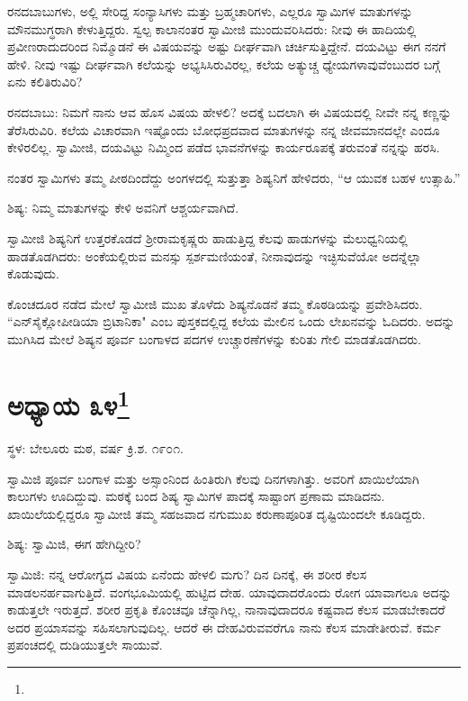 ರನದಬಾಬುಗಳು, ಅಲ್ಲಿ ಸೇರಿದ್ದ ಸಂನ್ಯಾಸಿಗಳು ಮತ್ತು ಬ್ರಹ್ಮಚಾರಿಗಳು, ಎಲ್ಲರೂ ಸ್ವಾಮಿಗಳ ಮಾತುಗಳನ್ನು ಮೌನಮುಗ್ಧರಾಗಿ ಕೇಳುತ್ತಿದ್ದರು. ಸ್ವಲ್ಪ ಕಾಲಾನಂತರ ಸ್ವಾಮೀಜಿ ಮುಂದುವರಿಸಿದರು: ನೀವು ಈ ಹಾದಿಯಲ್ಲಿ ಪ್ರವೀಣರಾದುದರಿಂದ ನಿಮ್ಮೊಡನೆ ಈ ವಿಷಯವನ್ನು ಅಷ್ಟು ದೀರ್ಘವಾಗಿ ಚರ್ಚಿಸುತ್ತಿದ್ದೇನೆ. ದಯವಿಟ್ಟು ಈಗ ನನಗೆ ಹೇಳಿ. ನೀವು ಇಷ್ಟು ದೀರ್ಘವಾಗಿ ಕಲೆಯನ್ನು ಅಭ್ಯಸಿಸಿರುವಿರಲ್ಲ, ಕಲೆಯ ಅತ್ಯುಚ್ಚ ಧ್ಯೇಯಗಳಾವುವೆಂಬುದರ ಬಗ್ಗೆ ಏನು ಕಲಿತಿರುವಿರಿ?

ರನದಬಾಬು: ನಿಮಗೆ ನಾನು ಆವ ಹೊಸ ವಿಷಯ ಹೇಳಲಿ? ಅದಕ್ಕೆ ಬದಲಾಗಿ ಈ ವಿಷಯದಲ್ಲಿ ನೀವೇ ನನ್ನ ಕಣ್ಣನ್ನು ತೆರೆಸಿರುವಿರಿ. ಕಲೆಯ ವಿಚಾರವಾಗಿ ಇಷ್ಟೊಂದು ಬೋಧಪ್ರದವಾದ ಮಾತುಗಳನ್ನು ನನ್ನ ಜೀವಮಾನದಲ್ಲೇ ಎಂದೂ ಕೇಳಿರಲಿಲ್ಲ. ಸ್ವಾಮೀಜಿ, ದಯವಿಟ್ಟು ನಿಮ್ಮಿಂದ ಪಡೆದ ಭಾವನೆಗಳನ್ನು ಕಾರ್ಯರೂಪಕ್ಕೆ ತರುವಂತೆ ನನ್ನನ್ನು ಹರಸಿ.

ನಂತರ ಸ್ವಾಮಿಗಳು ತಮ್ಮ ಪೀಠದಿಂದೆದ್ದು ಅಂಗಳದಲ್ಲಿ ಸುತ್ತುತ್ತಾ ಶಿಷ್ಯನಿಗೆ ಹೇಳಿದರು, “ಆ ಯುವಕ ಬಹಳ ಉತ್ಸಾಹಿ.”

ಶಿಷ್ಯ: ನಿಮ್ಮ ಮಾತುಗಳನ್ನು ಕೇಳಿ ಅವನಿಗೆ ಆಶ್ಚರ್ಯವಾಗಿದೆ.

ಸ್ವಾಮೀಜಿ ಶಿಷ್ಯನಿಗೆ ಉತ್ತರಕೊಡದೆ ಶ‍್ರೀರಾಮಕೃಷ್ಣರು ಹಾಡುತ್ತಿದ್ದ ಕೆಲವು ಹಾಡುಗಳನ್ನು ಮೆಲುಧ್ವನಿಯಲ್ಲಿ ಹಾಡತೊಡಗಿದರು: ಅಂಕೆಯಲ್ಲಿರುವ ಮನಸ್ಸು ಸ್ಪರ್ಶಮಣಿಯಂತೆ, ನೀನಾವುದನ್ನು ಇಚ್ಛಿಸುವೆಯೋ ಅದನ್ನೆಲ್ಲಾ ಕೊಡುವುದು.

ಕೊಂಚದೂರ ನಡೆದ ಮೇಲೆ ಸ್ವಾಮೀಜಿ ಮುಖ ತೊಳೆದು ಶಿಷ್ಯನೊಡನೆ ತಮ್ಮ ಕೊಠಡಿಯನ್ನು ಪ್ರವೇಶಿಸಿದರು. “ಎನ್‌ಸೈಕ್ಲೋಪೀಡಿಯಾ ಬ್ರಿಟಾನಿಕಾ" ಎಂಬ ಪುಸ್ತಕದಲ್ಲಿದ್ದ ಕಲೆಯ ಮೇಲಿನ ಒಂದು ಲೇಖನವನ್ನು ಓದಿದರು. ಅದನ್ನು ಮುಗಿಸಿದ ಮೇಲೆ ಶಿಷ್ಯನ ಪೂರ್ವ ಬಂಗಾಳದ ಪದಗಳ ಉಚ್ಚಾರಣೆಗಳನ್ನು ಕುರಿತು ಗೇಲಿ ಮಾಡತೊಡಗಿದರು.

\newpage

\chapter[ಅಧ್ಯಾಯ ೩೪]{ಅಧ್ಯಾಯ ೩೪\protect\footnote{}}

\centerline{ಸ್ಥಳ: ಬೇಲೂರು ಮಠ, ವರ್ಷ ಕ್ರಿ.ಶ. ೧೯೦೧.}

ಸ್ವಾಮಿಜಿ ಪೂರ್ವ ಬಂಗಾಳ ಮತ್ತು ಅಸ್ಸಾಂನಿಂದ ಹಿಂತಿರುಗಿ ಕೆಲವು ದಿನಗಳಾಗಿತ್ತು. ಅವರಿಗೆ ಖಾಯಿಲೆಯಾಗಿ ಕಾಲುಗಳು ಊದಿದ್ದುವು. ಮಠಕ್ಕೆ ಬಂದ ಶಿಷ್ಯ ಸ್ವಾಮಿಗಳ ಪಾದಕ್ಕೆ ಸಾಷ್ಟಾಂಗ ಪ್ರಣಾಮ ಮಾಡಿದನು. ಖಾಯಿಲೆಯಲ್ಲಿದ್ದರೂ ಸ್ವಾಮೀಜಿ ತಮ್ಮ ಸಹಜವಾದ ನಗುಮುಖ ಕರುಣಾಪೂರಿತ ದೃಷ್ಟಿಯಿಂದಲೇ ಕೂಡಿದ್ದರು.

ಶಿಷ್ಯ: ಸ್ವಾಮಿಜಿ, ಈಗ ಹೇಗಿದ್ದೀರಿ?

ಸ್ವಾಮಿಜಿ: ನನ್ನ ಆರೋಗ್ಯದ ವಿಷಯ ಏನೆಂದು ಹೇಳಲಿ ಮಗು? ದಿನ ದಿನಕ್ಕೆ, ಈ ಶರೀರ ಕೆಲಸ ಮಾಡಲನರ್ಹವಾಗುತ್ತಿದೆ. ವಂಗಭೂಮಿಯಲ್ಲಿ ಹುಟ್ಟಿದ ದೇಹ. ಯಾವುದಾದರೊಂದು ರೋಗ ಯಾವಾಗಲೂ ಅದನ್ನು ಕಾಡುತ್ತಲೇ ಇರುತ್ತದೆ. ಶರೀರ ಪ್ರಕೃತಿ ಕೊಂಚವೂ ಚೆನ್ನಾಗಿಲ್ಲ, ನಾನಾವುದಾದರೂ ಕಷ್ಟವಾದ ಕೆಲಸ ಮಾಡಬೇಕಾದರೆ ಅದರ ಪ್ರಯಾಸವನ್ನು ಸಹಿಸಲಾಗುವುದಿಲ್ಲ. ಆದರೆ ಈ ದೇಹವಿರುವವರೆಗೂ ನಾನು ಕೆಲಸ ಮಾಡೇತೀರುವೆ. ಕರ್ಮ ಪ್ರಪಂಚದಲ್ಲಿ ದುಡಿಯುತ್ತಲೇ ಸಾಯುವೆ.

